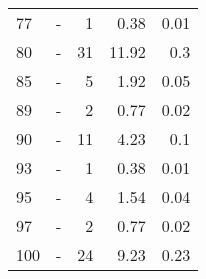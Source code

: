 \begin{longtable}{lXrrr}
        77 & \multicolumn{1}{X}{-} & %
          \num{1} &
          \num[round-mode=places,round-precision=2]{0.38} &
          \num[round-mode=places,round-precision=2]{0.01} \\

        80 & \multicolumn{1}{X}{-} & %
          \num{31} &
          \num[round-mode=places,round-precision=2]{11.92} &
          \num[round-mode=places,round-precision=2]{0.3} \\

        85 & \multicolumn{1}{X}{-} & %
          \num{5} &
          \num[round-mode=places,round-precision=2]{1.92} &
          \num[round-mode=places,round-precision=2]{0.05} \\

        89 & \multicolumn{1}{X}{-} & %
          \num{2} &
          \num[round-mode=places,round-precision=2]{0.77} &
          \num[round-mode=places,round-precision=2]{0.02} \\

        90 & \multicolumn{1}{X}{-} & %
          \num{11} &
          \num[round-mode=places,round-precision=2]{4.23} &
          \num[round-mode=places,round-precision=2]{0.1} \\

        93 & \multicolumn{1}{X}{-} & %
          \num{1} &
          \num[round-mode=places,round-precision=2]{0.38} &
          \num[round-mode=places,round-precision=2]{0.01} \\

        95 & \multicolumn{1}{X}{-} & %
          \num{4} &
          \num[round-mode=places,round-precision=2]{1.54} &
          \num[round-mode=places,round-precision=2]{0.04} \\

        97 & \multicolumn{1}{X}{-} & %
          \num{2} &
          \num[round-mode=places,round-precision=2]{0.77} &
          \num[round-mode=places,round-precision=2]{0.02} \\

        100 & \multicolumn{1}{X}{-} & %
          \num{24} &
          \num[round-mode=places,round-precision=2]{9.23} &
          \num[round-mode=places,round-precision=2]{0.23} \\


\end{longtable}
